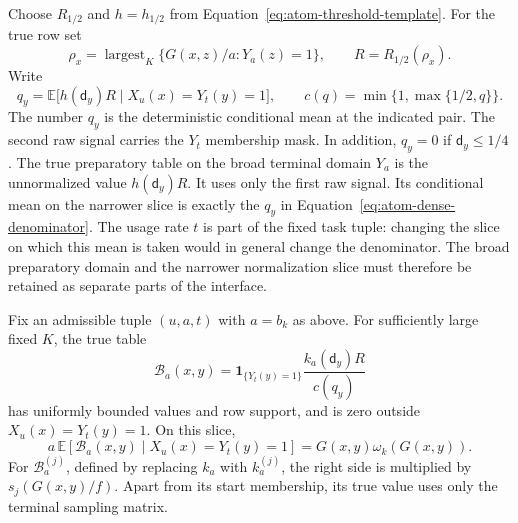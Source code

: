 Choose $R_{1/2}$ and $h=h_{1/2}$ from
Equation~\eqref{eq:atom-threshold-template}.  For the true row set
\[
 \rho_x=\operatorname{largest}_K
   \{G(x,z)/a:Y_a(z)=1\},\qquad R=R_{1/2}(\rho_x).
\]
Write
\begin{equation}
 q_y=\mathbb E\bigl[h(\mathsf{d}_y)R\mid X_u(x)=Y_t(y)=1\bigr],
 \qquad
 c(q)=\min\{1,\max\{1/2,q\}\}.
 \label{eq:atom-dense-denominator}
\end{equation}
The number $q_y$ is the deterministic conditional mean at the indicated
pair.  The second raw signal carries the $Y_t$ membership mask.  In
addition, $q_y=0$ if $\mathsf{d}_y\le1/4$.
The true preparatory table on the broad
terminal domain $Y_a$ is the unnormalized value $h(\mathsf{d}_y)R$.  It uses only
the first raw signal.  Its conditional mean on the narrower slice is
exactly the $q_y$ in Equation~\eqref{eq:atom-dense-denominator}.
The usage rate $t$ is part of the fixed task tuple: changing the slice
on which this mean is taken would in general change the denominator.
The broad preparatory domain and the narrower normalization slice must
therefore be retained as separate parts of the interface.

\begin{lemma}
\label{lem:atom-dense}
Fix an admissible tuple $(u,a,t)$ with $a=b_k$ as above.
For sufficiently large fixed $K$, the true table
\begin{equation}
 \mathcal B_a(x,y)=
  \mathbf1_{\{Y_t(y)=1\}}\frac{k_a(\mathsf{d}_y)R}{c(q_y)}
 \label{eq:atom-dense-table}
\end{equation}
has uniformly bounded values and row support, and is zero outside
$X_u(x)=Y_t(y)=1$. On this slice,
\[
 a\,\mathbb E[\mathcal B_a(x,y)\mid X_u(x)=Y_t(y)=1]
       =G(x,y)\omega_k(G(x,y)).
\]
For $\mathcal B_a^{(j)}$, defined by replacing $k_a$ with $k_a^{(j)}$,
the right side is multiplied by $s_j(G(x,y)/f)$.
Apart from its start membership, its true value uses only the terminal
sampling matrix.
\end{lemma}

